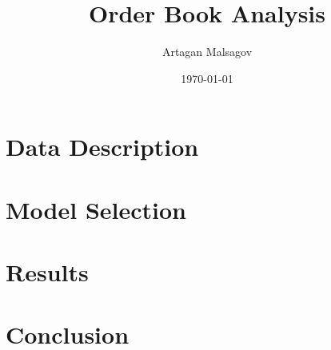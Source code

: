 \documentclass[english, 11pt, a4paper]{article}
\begin{document}
\baselineskip18pt


\title{Order Book Analysis}

\author{Artagan Malsagov}

\date{\today}


\maketitle



\section{Data Description}

\section{Model Selection}

\section{Results}

\section{Conclusion}       


%
\end{document}
